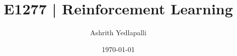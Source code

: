 \title{E1277 | Reinforcement Learning}
\author{Ashrith Yedlapalli}
\date{\today}

\makeatletter
\def\maketitle{
    \begin{center}
        {\LARGE \bfseries \@title~\\[1ex]}
        {\large \@author~\\[1ex]}
        {\@date}
    \end{center}
}
\makeatother
\maketitle
